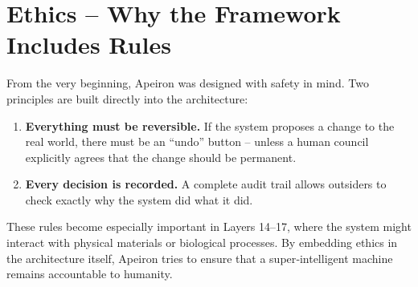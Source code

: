 \section{Ethics – Why the Framework Includes Rules}
\label{sec:ethics}

From the very beginning, Apeiron was designed with safety in mind.
Two principles are built directly into the architecture:

\begin{enumerate}
    \item \textbf{Everything must be reversible.}  If the system proposes
    a change to the real world, there must be an “undo” button – unless
    a human council explicitly agrees that the change should be permanent.
    \item \textbf{Every decision is recorded.}  A complete audit trail
    allows outsiders to check exactly why the system did what it did.
\end{enumerate}

These rules become especially important in Layers 14–17, where the
system might interact with physical materials or biological processes.
By embedding ethics in the architecture itself, Apeiron tries to ensure
that a super‑intelligent machine remains accountable to humanity.